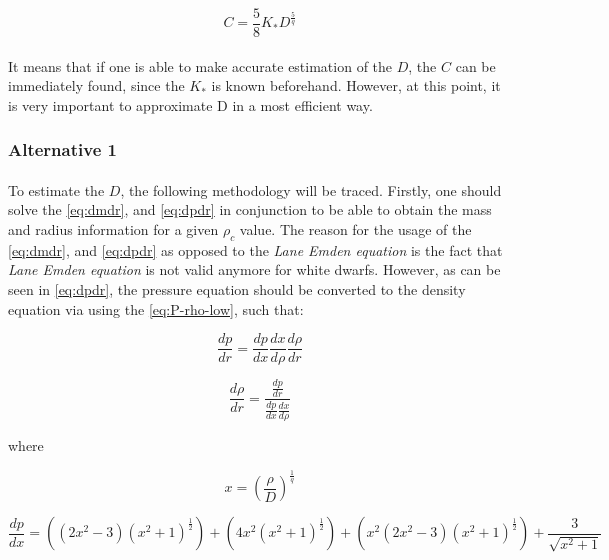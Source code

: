 \documentclass[letterpaper,12pt]{article}
\begin{document}
\begin{equation*}
    C = \frac{5}{8}K_* D^{\frac{5}{q}}
\end{equation*}

\paragraph{} It means that if one is able to make accurate estimation of the $D$, the $C$ can be immediately found, since the $K_*$ is known beforehand. However, at this point, it is very important to approximate D in a most efficient way. 

\subsubsection{Alternative 1}
\label{sec:D_fit_a1}
\paragraph{} To estimate the $D$, the following methodology will be traced. Firstly, one should solve the \eqref{eq:dmdr}, and \eqref{eq:dpdr} in conjunction to be able to obtain the mass and radius information for a given $\rho_c$ value. The reason for the usage of the \eqref{eq:dmdr}, and \eqref{eq:dpdr} as opposed to the \textit{Lane Emden equation} is the fact that \textit{Lane Emden equation} is not valid anymore for white dwarfs. However, as can be seen in \eqref{eq:dpdr}, the pressure equation should be converted to the density equation via using the \eqref{eq:P-rho-low}, such that:

\begin{equation*}
    \frac{dp}{dr} = \frac{dp}{dx} \frac{dx}{d \rho} \frac{d \rho}{dr} 
\end{equation*}

\begin{equation*}
    \frac{d \rho}{dr}  = \frac{ \frac{dp}{dr}}{ \frac{dp}{dx} \frac{dx}{d \rho} }
\end{equation*}

where 

\begin{equation*}
    x = \left(\frac{\rho}{D}\right)^{\frac{1}{q}}
\end{equation*}

\begin{equation*}
    \frac{dp}{dx} =  \left(\left(2  x ^ 2 - 3\right)  (x ^ 2 + 1) ^ {\frac{1}{2}}\right) + \left(4x^2  \left(x ^ 2 + 1\right) ^ {\frac{1}{2}}\right) + \left(x^2 (2  x ^ 2 - 3) \left(x ^ 2 + 1\right) ^ {\frac{1}{2}}\right) + \frac{3}{\sqrt{x ^ 2 + 1}}
\end{equation*}
\end{document}
